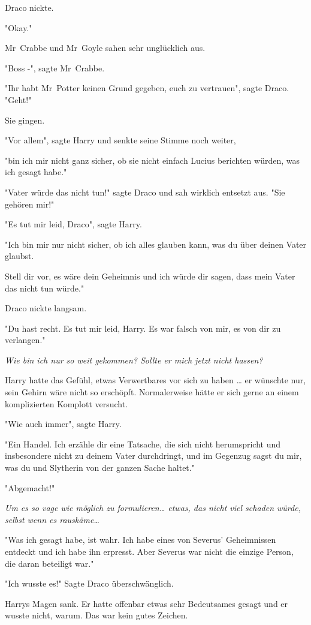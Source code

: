 {Draco nickte.

"Okay."

Mr~Crabbe und Mr~Goyle sahen sehr unglücklich aus.

"Boss -", sagte Mr~Crabbe.

"Ihr habt Mr~Potter keinen Grund gegeben, euch zu vertrauen", sagte Draco. "Geht!"

Sie gingen.

"Vor allem", sagte Harry und senkte seine Stimme noch weiter,

"bin ich mir nicht ganz sicher, ob sie nicht einfach Lucius berichten würden, was ich gesagt habe."

"Vater würde das nicht tun!" sagte Draco und sah wirklich entsetzt aus. "Sie gehören mir!"

"Es tut mir leid, Draco", sagte Harry.

"Ich bin mir nur nicht sicher, ob ich alles glauben kann, was du über deinen Vater glaubst.

Stell dir vor, es wäre dein Geheimnis und ich würde dir sagen, dass mein Vater das nicht tun würde."

Draco nickte langsam.

"Du hast recht. Es tut mir leid, Harry. Es war falsch von mir, es von dir zu verlangen."

\emph{Wie bin ich nur so weit gekommen? Sollte er mich jetzt nicht hassen?}

Harry hatte das Gefühl, etwas Verwertbares vor sich zu haben … er wünschte nur, sein Gehirn wäre nicht so erschöpft. Normalerweise hätte er sich gerne an einem komplizierten Komplott versucht.

"Wie auch immer", sagte Harry.

"Ein Handel. Ich erzähle dir eine Tatsache, die sich nicht herumspricht und insbesondere nicht zu deinem Vater durchdringt, und im Gegenzug sagst du mir, was du und Slytherin von der ganzen Sache haltet."

"Abgemacht!"

\emph{Um es so vage wie möglich zu formulieren… etwas, das nicht viel schaden würde, selbst wenn es rauskäme…}

"Was ich gesagt habe, ist wahr. Ich habe eines von Severus' Geheimnissen entdeckt und ich habe ihn erpresst. Aber Severus war nicht die einzige Person, die daran beteiligt war."

"Ich wusste es!" Sagte Draco überschwänglich.

Harrys Magen sank. Er hatte offenbar etwas sehr Bedeutsames gesagt und er wusste nicht, warum. Das war kein gutes Zeichen.

}
